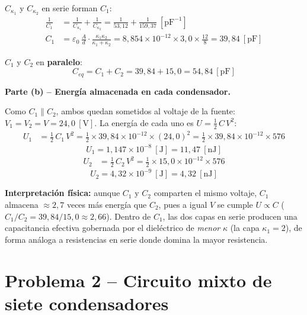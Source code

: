 \documentclass[12pt,letterpaper]{article}
\begin{document}
$C_{\kappa_1}$ y $C_{\kappa_2}$ en serie forman $C_1$:
\begin{align*}
    \frac{1}{C_1} &= \frac{1}{C_{\kappa_1}} + \frac{1}{C_{\kappa_2}}
                   = \frac{1}{53{,}12} + \frac{1}{159{,}37}\ [\text{pF}^{-1}]\\[4pt]
    C_1           &= \varepsilon_0\,\frac{A}{d}\cdot\frac{\kappa_1\kappa_2}{\kappa_1+\kappa_2}
                   = 8{,}854\times10^{-12}\times 3{,}0\times\frac{12}{8}
                   = 39{,}84\ [\text{pF}]
\end{align*}

$C_1$ y $C_2$ en \textbf{paralelo}:
\[
    \boxed{C_{eq} = C_1 + C_2 = 39{,}84 + 15{,}0 = 54{,}84\ [\text{pF}]}
\]

\medskip
\noindent\textbf{Parte (b) -- Energ\'ia almacenada en cada condensador.}

Como $C_1 \parallel C_2$, ambos quedan sometidos al voltaje de la fuente:
$V_1 = V_2 = V = 24{,}0\ [\text{V}]$. La energ\'ia de cada uno es $U = \tfrac12\,C\,V^2$:
\begin{align*}
    U_1 &= \tfrac12\,C_1\,V^2
         = \tfrac12\times 39{,}84\times10^{-12}\times(24{,}0)^2
         = \tfrac12\times 39{,}84\times10^{-12}\times 576
\end{align*}
\[
    \boxed{U_1 = 1{,}147\times10^{-8}\ [\text{J}] = 11{,}47\ [\text{nJ}]}
\]
\begin{align*}
    U_2 &= \tfrac12\,C_2\,V^2
         = \tfrac12\times 15{,}0\times10^{-12}\times 576
\end{align*}
\[
    \boxed{U_2 = 4{,}32\times10^{-9}\ [\text{J}] = 4{,}32\ [\text{nJ}]}
\]

\noindent\textbf{Interpretaci\'on f\'isica:} aunque $C_1$ y $C_2$ comparten el mismo voltaje, $C_1$
almacena $\approx 2{,}7$ veces m\'as energ\'ia que $C_2$, pues a igual $V$ se cumple $U\propto C$
($C_1/C_2 = 39{,}84/15{,}0 \approx 2{,}66$). Dentro de $C_1$, las dos capas en serie producen una
capacitancia efectiva gobernada por el diel\'ectrico de \emph{menor} $\kappa$ (la capa
$\kappa_1=2$), de forma an\'aloga a resistencias en serie donde domina la mayor resistencia.

\newpage

\section*{Problema 2 -- Circuito mixto de siete condensadores}
\end{document}
